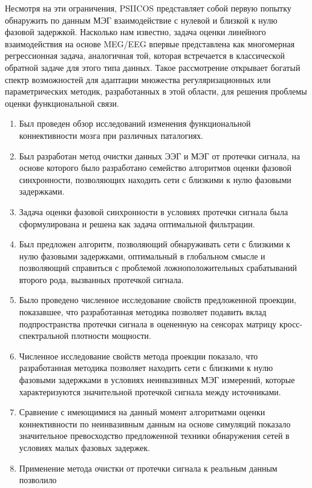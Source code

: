 Несмотря на эти ограничения, PSIICOS представляет собой первую попытку
обнаружить по данным МЭГ взаимодействие с нулевой и близкой к нулю фазовой
задержкой.  Насколько нам известно, задача оценки линейного взаимодействия на
основе MEG/EEG впервые представлена как многомерная регрессионная задача,
аналогичная той, которая встречается в классической обратной задаче для этого
типа данных. Такое рассмотрение открывает богатый спектр возможностей для
адаптации множества регуляризационных или параметрических методик,
разработанных в этой области, для решения проблемы оценки функциональной связи.

\begin{enumerate}
  \item Был проведен обзор исследований изменения функциональной коннективности
      мозга при различных паталогиях.
  \item Был разработан метод очистки данных ЭЭГ и МЭГ от протечки сигнала, на
      основе которого было разработано семейство алгоритмов оценки фазовой синхронности,
      позволяющих находить сети с близкими к нулю фазовыми задержками.
  \item Задача оценки фазовой синхронности в условиях протечки сигнала была
      сформулирована и решена как задача оптимальной фильтрации.
  \item Был предложен алгоритм, позволяющий обнаруживать сети с близкими
      к нулю фазовыми задержками, оптимальный в глобальном смысле и позволяющий
      справиться с проблемой ложноположительных срабатываний второго рода, вызванных
      протечкой сигнала.
  \item Было проведено численное исследование свойств предложенной
      проекции, показавшее, что разработанная методика позволяет
      подавить вклад подпространства протечки сигнала в оцененную
      на сенсорах матрицу кросс-спектральной плотности мощности.
  \item Численное исследование свойств метода проекции показало, что
      разработанная методика позволяет находить сети с близкими к нулю фазовыми задержками в условиях
      неинвазивных МЭГ измерений, которые характеризуются значительной протечкой
      сигнала между источниками.
  \item Сравнение с имеющимися на данный момент алгоритмами оценки коннективности
      по неинвазивным данным на основе симуляций показало значительное превосходство
      предложенной техники обнаружения сетей в условиях малых фазовых задержек.
  \item Применение метода очистки от протечки сигнала к реальным данным позволило

\end{enumerate}
